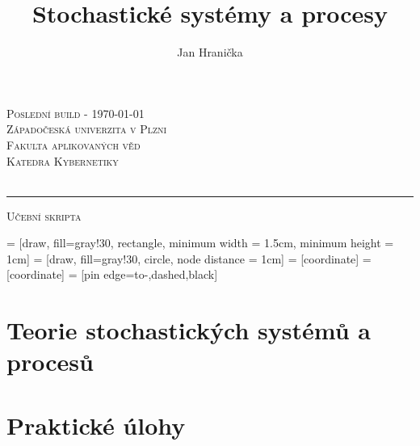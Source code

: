 \documentclass[12pt,a4paper]{report}
\author{Jan Hranička}
\title{Stochastické systémy a procesy}
\makeatletter
\let\Title\@title
\def\Subtitle{Učební skripta}
\renewcommand{\titlepage}{
	\begin{center}
	\thispagestyle{empty}

	{\huge\textsc{Poslední build - \today}} \\[3cm]
	{\large\textsc{Západočeská univerzita v Plzni}}\\[.5em]
	{\large\textsc{Fakulta aplikovaných věd}}\\[.5em]
	{\large\textsc{Katedra Kybernetiky}}\\[4cm]

	{\Huge\textsc{\Title}}\\[.5em]
	\hrule\vspace*{.5em}
	{\Large\textsc{\Subtitle}}
	\vfill
	\the\year

	\end{center}
	\newpage
	\setcounter{page}{2}
}
\makeatother
\begin{document}
\titlepage
\tableofcontents

	 = [draw, fill=gray!30, rectangle, minimum width = 1.5cm, minimum height = 1cm]
	 = [draw, fill=gray!30, circle, node distance = 1cm]
	 = [coordinate]
	 = [coordinate]
	 = [pin edge={to-,dashed,black}]

\part{Teorie stochastických systémů a procesů}












\part{Praktické úlohy}




\end{document}
